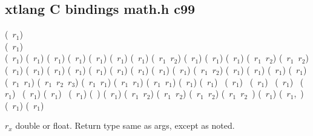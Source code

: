 \documentclass[10pt, twoside]{article}   	%
\begin{document}
\begin{multicols}{3}
\section*{xtlang C bindings math.h c99}
\begin{multicols}{3}
(~$r_1$) \\
(~$r_1$) \\
(~$r_1$)
(~$r_1$)
(~$r_1$)
(~$r_1$)
(~$r_1$)
(~$r_1$)
(~$r_1$)
(~$r_1$~$r_2$)
(~$r_1$)
(~$r_1$)
(~$r_1$)
(~$r_1$~$r_2$)
(~$r_1$~$r_2$)
(~$r_1$)
(~$r_1$)
(~$r_1$)
(~$r_1$)
(~$r_1$)
(~$r_1$)
(~$r_1$)
(~$r_1$)
(~$r_1$)
(~$r_1$~$r_2$)
(~$r_1$)
(~$r_1$)
(~$r_1$)
(~$r_1$)
(~$r_1$~$r_1$)
(~$r_1$~$r_2$~$r_3$)
(~$r_1$~$r_1$)
(~$r_1$~$r_1$)
(~$r_1$~$r_1$)
(~$r_1$)
(~$r_1$)
~(~$r_1$)
~(~$r_1$)
~(~$r_1$)
~(~$r_1$)
~(~$r_1$)
(~$r_1$)
~(~$r_1$)
(~)
(~$r_1$)
(~$r_1$~$r_2$)
(~$r_1$~$r_2$)
(~$r_1$~$r_2$)
(~$r_1$~$r_2$~)
(~$r_1$)
(~$r_1$,~)
(~$r_1$)
(~$r_1$) \\
\end{multicols}
\scriptsize
{\raggedright
$r_x$ double or float. Return type same as args, except as noted.\par}
\normalsize



\end{multicols}
\end{document}
